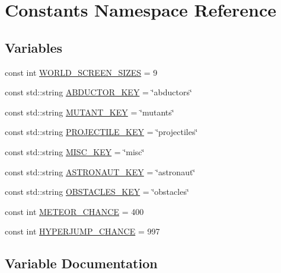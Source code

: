 \hypertarget{namespace_constants}{}\section{Constants Namespace Reference}
\label{namespace_constants}
\subsection*{Variables}
\begin{DoxyCompactItemize}
\item 
const int \hyperlink{namespace_constants_aebe280173f42e4d8992d5042f867d586}{W\+O\+R\+L\+D\+\_\+\+S\+C\+R\+E\+E\+N\+\_\+\+S\+I\+Z\+ES} = 9
\item 
const std\+::string \hyperlink{namespace_constants_a48a486618490a227e0da4511105e15b8}{A\+B\+D\+U\+C\+T\+O\+R\+\_\+\+K\+EY} = \char`\"{}abductors\char`\"{}
\item 
const std\+::string \hyperlink{namespace_constants_a135854013873b873e538f009ce8194f3}{M\+U\+T\+A\+N\+T\+\_\+\+K\+EY} = \char`\"{}mutants\char`\"{}
\item 
const std\+::string \hyperlink{namespace_constants_a844a519bb06065fbb715ab41bc02521b}{P\+R\+O\+J\+E\+C\+T\+I\+L\+E\+\_\+\+K\+EY} = \char`\"{}projectiles\char`\"{}
\item 
const std\+::string \hyperlink{namespace_constants_ae3922e95cbdf0281ae2ac5420edeca73}{M\+I\+S\+C\+\_\+\+K\+EY} = \char`\"{}misc\char`\"{}
\item 
const std\+::string \hyperlink{namespace_constants_a1fc6d1c48750c5bce513ff09a72cf655}{A\+S\+T\+R\+O\+N\+A\+U\+T\+\_\+\+K\+EY} = \char`\"{}astronaut\char`\"{}
\item 
const std\+::string \hyperlink{namespace_constants_aee2c9a41a0dbab5f02f4561c9a59aff9}{O\+B\+S\+T\+A\+C\+L\+E\+S\+\_\+\+K\+EY} = \char`\"{}obstacles\char`\"{}
\item 
const int \hyperlink{namespace_constants_a333c506f364af548200051c978a5412e}{M\+E\+T\+E\+O\+R\+\_\+\+C\+H\+A\+N\+CE} = 400
\item 
const int \hyperlink{namespace_constants_a2dca6545414f686a3f491e9e68b99fbb}{H\+Y\+P\+E\+R\+J\+U\+M\+P\+\_\+\+C\+H\+A\+N\+CE} = 997
\end{DoxyCompactItemize}


\subsection{Variable Documentation}
\mbox{\label{namespace_constants_a48a486618490a227e0da4511105e15b8}} 
